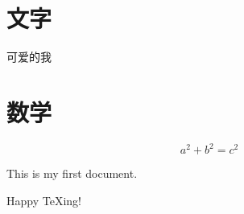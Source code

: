\documentclass[UTF8]{ctexart}
\begin{document}
\section{文字}
可爱的我

\section{数学}
\[
    a^2 + b^2 = c^2
\]



This is my first document.

Happy \TeX ing!
\end{document}
